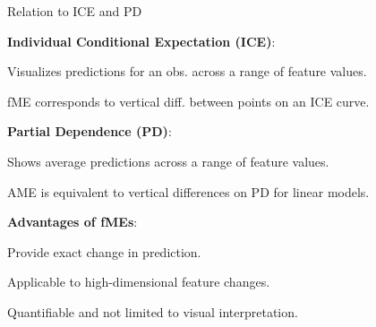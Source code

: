 \documentclass[10pt,compress,t,notes=noshow, xcolor=table]{beamer}
\begin{document}



\begin{framei}[align=top]{Relation to ICE and PD}
\item \textbf{Individual Conditional Expectation (ICE)}:
\begin{itemizeS}
\item Visualizes predictions for an obs. across a range of feature values.
\item fME corresponds to vertical diff. between points on an ICE curve.
\end{itemizeS}
\item \textbf{Partial Dependence (PD)}:
\begin{itemizeS}
\item Shows average predictions across a range of feature values.
\item AME is equivalent to vertical differences on PD for linear models.
\end{itemizeS}
\item \textbf{Advantages of fMEs}:
\begin{itemizeS}
\item Provide exact change in prediction.
\item Applicable to high-dimensional feature changes.
\item Quantifiable and not limited to visual interpretation.
\end{itemizeS}
\end{framei}




\end{document}
